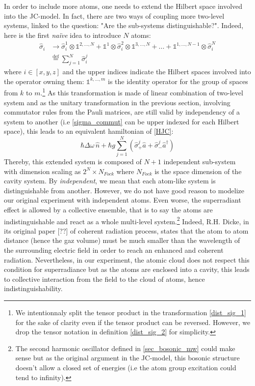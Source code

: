 \documentclass[10pt]{report}
\begin{document}
In order to include more atoms, one needs to extend the Hilbert space involved into the JC-model. In fact, there are two ways of coupling more two-level systems, linked to the question: "Are the sub-systems distinguishable?". Indeed, here is the first \textit{naïve} idea to introduce $N$ atoms:
\begin{align}
\label{dist_sig_1}
\hat{\sigma}_i &\rightarrow \hat{\sigma}_i^1 \otimes \mathbb{1}^{2,...,N} + \mathbb{1}^{1} \otimes \hat{\sigma}_i^2 \otimes \mathbb{1}^{3,...,N} + ... + \mathbb{1}^{1,...,N-1} \otimes \hat{\sigma}_i^N\\
\label{dist_sig_2}
&\stackrel{\text{def}}{=} \sum_{j=1}^{N} \hat{\sigma}_i^j
\end{align}
where $i \in \left[x,y,z\right]$ and the upper indices indicate the Hilbert spaces involved into the operator owning them: $\mathbb{1}^{k,...,m}$ is the identity operator for the group of spaces from $k$ to $m$.\footnote{We intentionnaly split the tensor product in the transformation \eqref{dist_sig_1} for the sake of clarity even if the tensor product can be reversed. However, we drop the tensor notation in definition \eqref{dist_sig_2} for simplicity.}
As this transformation is made of linear combination of two-level system and as the unitary transformation in the previous section, involving commutator rules from the Pauli matrices, are still valid by independency of a system to another (i.e \eqref{sigma_commut} can be upper indexed for each Hilbert space), this leads to an equivalent hamiltonian of \eqref{HJC}:
\begin{equation}
\hbar\Delta\omega\,\hat{n} + \hbar g \sum_{j=1}^{N} \left(\hat{\sigma}_+^j \hat{a} + \hat{\sigma}_-^j \hat{a}^{\dag} \right)
\end{equation}
Thereby, this extended system is composed of $N+1$ independent sub-system with dimension scaling as $2^N \times N_{Fock}$ where $N_{Fock}$ is the space dimension of the cavity system. By \textit{independent}, we mean that each atom-like system is distinguishable from another. However, we do not have good reason to modelize our original experiment with independent atoms. Even worse, the superradiant effect is allowed by a collective ensemble, that is to say the atoms are indistinguishable and react as a whole multi-level system.\footnote{The second harmonic oscillator defined in \eqref{sec_bosonic_mw} could make sense but as the original argument in the JC-model, this bosonic structure doesn't allow a closed set of energies (i.e the atom group excitation could tend to infinity).} Indeed, R.H. Dicke, in its original paper [??] of coherent radiation process, states that the atom to atom distance (hence the gaz volume) must be much smaller than the wavelength of the surrounding electric field in order to reach an enhanced and coherent radiation. Nevertheless, in our experiment, the atomic cloud does not respect this condition for superradiance but as the atoms are enclosed into a cavity, this leads to collective interaction from the field to the cloud of atoms, hence indistinguishability.
\end{document}
